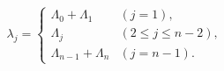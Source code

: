 \begin{equation}
\lambda_j=
 \begin{cases}
  \Lambda_0+\Lambda_1 & (j=1) ,\\
  \Lambda_j&(2\leq j \leq n-2) ,\\
  \Lambda_{n-1}+\Lambda_{n} & (j=n-1) .
 \end{cases}
\end{equation}

